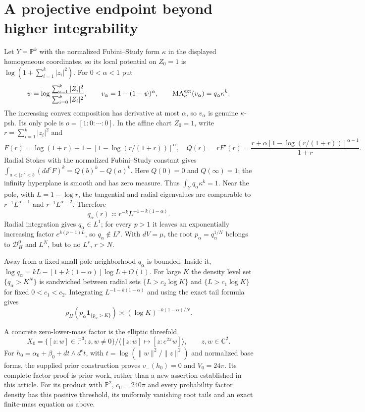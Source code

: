 \documentclass[11pt]{article}
\newcommand{\ddc}{dd^c}
\newcommand{\MA}{\operatorname{MA}}
\newcommand{\PP}{\mathbb P}
\theoremstyle{remark}\newtheorem{remark}[theorem]{Remark}
\begin{document}
\section{A projective endpoint beyond higher integrability}
Let $Y=\PP^k$ with the normalized Fubini--Study form $\kappa$
in the displayed homogeneous coordinates, so its local potential
on $Z_0=1$ is $\log(1+\sum_{i=1}^k|z_i|^2)$.
For $0<\alpha<1$ put
\[
 \psi=\log\frac{\sum_{i=1}^k|Z_i|^2}{\sum_{i=0}^k|Z_i|^2},
 \qquad v_\alpha=1-(1-\psi)^\alpha,
 \qquad\MA_\kappa^{\rm ext}(v_\alpha)=q_\alpha\kappa^k.
\]
The increasing convex composition has derivative at most $\alpha$,
so $v_\alpha$ is genuine $\kappa$-psh. Its only pole is
$o=[1:0:\cdots:0]$. In the affine chart $Z_0=1$, write
$r=\sum_{i=1}^k|z_i|^2$ and
\[
 F(r)=\log(1+r)+1-
       [1-\log(r/(1+r))]^\alpha,\quad
 Q(r)=rF'(r)=\frac{r+\alpha[1-\log(r/(1+r))]^{\alpha-1}}{1+r}.
\]
Radial Stokes with the normalized Fubini--Study constant gives
$\int_{a<|z|^2<b}(\ddc F)^k=Q(b)^k-Q(a)^k$.
Here $Q(0)=0$ and $Q(\infty)=1$; the infinity hyperplane is smooth
and has zero measure. Thus $\int_Yq_\alpha\kappa^k=1$.
Near the pole, with $L=1-\log r$, the tangential and radial
eigenvalues are comparable to $r^{-1}L^{\alpha-1}$ and
$r^{-1}L^{\alpha-2}$. Therefore
\[
 q_\alpha(r)\asymp r^{-k}L^{-1-k(1-\alpha)}.
\]
Radial integration gives $q_\alpha\in L^1$; for every $p>1$ it
leaves an exponentially increasing factor $e^{k(p-1)L}$, so
$q_\alpha\notin L^p$. With $dV=\mu$, the root
$p_\alpha=q_\alpha^{1/N}$ belongs to $\mathcal D_H^0$ and $L^N$,
but to no $L^r$, $r>N$.

Away from a fixed small pole neighborhood $q_\alpha$ is bounded.
Inside it, $\log q_\alpha=kL-[1+k(1-\alpha)]\log L+O(1)$.
For large $K$ the density level set $\{q_\alpha>K^N\}$ is
sandwiched between radial sets $\{L>c_2\log K\}$ and
$\{L>c_1\log K\}$ for fixed $0<c_1<c_2$.
Integrating $L^{-1-k(1-\alpha)}$ and using the exact tail formula gives
\[
 \rho_H(p_\alpha\mathbf1_{\{p_\alpha>K\}})
       \asymp(\log K)^{-k(1-\alpha)/N}.
\]

A concrete zero-lower-mass factor is the elliptic threefold
\[
 X_0=\{[z:w]\in\PP^3:z,w\ne0\}/\langle[z:w]\mapsto[z:e^{2\pi}w]\rangle,
 \qquad z,w\in\mathbb C^2.
\]
For $h_0=\alpha_0+\beta_0+dt\wedge d^ct$, with
$t=\log(\|w\|^2/\|z\|^2)$ and normalized base forms, the supplied
prior construction \cite[Appendix]{Product} proves
$v_-(h_0)=0$ and $V_0=24\pi$. Its complete factor proof is prior
work, rather than a new assertion established in this article.
For its product with $\PP^2$, $c_0=240\pi$ and every probability
factor density has this positive threshold, its uniformly vanishing
root tails and an exact finite-mass equation as above.
\end{document}
